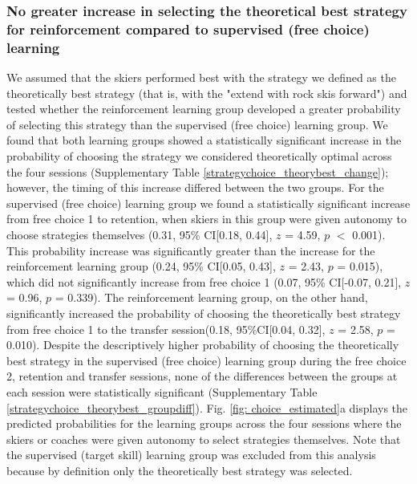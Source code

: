 \documentclass[pdflatex,sn-nature]{sn-jnl}%
\theoremstyle{thmstyleone}%
\theoremstyle{thmstyletwo}%
\theoremstyle{thmstylethree}%
\begin{document}
\subsubsection{No greater increase in selecting the theoretical best strategy for reinforcement compared to supervised (free choice) learning}\label{result_strategychoice_theorybest}
We assumed that the skiers performed best with the strategy we defined as the theoretically best strategy (that is, with the "extend with rock skis forward") and tested whether the reinforcement learning group developed a greater probability of selecting this strategy than the supervised (free choice) learning group. We found that both learning groups showed a statistically significant increase in the probability of choosing the strategy we considered theoretically optimal across the four sessions (Supplementary Table \ref{strategychoice_theorybest_change}); however, the timing of this increase differed between the two groups. For the supervised (free choice) learning group we found a statistically significant increase from free choice 1 to retention, when skiers in this group were given autonomy to choose strategies themselves (0.31, 95\% CI[0.18, 0.44], $z$ = 4.59, $p$ $<$ 0.001). This probability increase was significantly greater than the increase for the reinforcement learning group (0.24, 95\% CI[0.05, 0.43], $z$ = 2.43, $p$ = 0.015), which did not significantly increase from free choice 1 (0.07, 95\% CI[-0.07, 0.21], $z$ = 0.96, $p$ = 0.339). The reinforcement learning group, on the other hand, significantly increased the probability of choosing the theoretically best strategy from free choice 1  to the transfer session(0.18, 95\%CI[0.04, 0.32], $z$ = 2.58, $p$ = 0.010). Despite the descriptively higher probability of choosing the theoretically best strategy in the supervised (free choice) learning group during the free choice 2, retention and transfer sessions, none of the differences between the groups at each session were statistically significant (Supplementary Table \ref{strategychoice_theorybest_groupdiff}). Fig. \ref{fig: choice_estimated}a displays the predicted probabilities for the learning groups across the four sessions where the skiers or coaches were given autonomy to select strategies themselves. Note that the supervised (target skill) learning group was excluded from this analysis because by definition only the theoretically best strategy was selected. 
\end{document}

